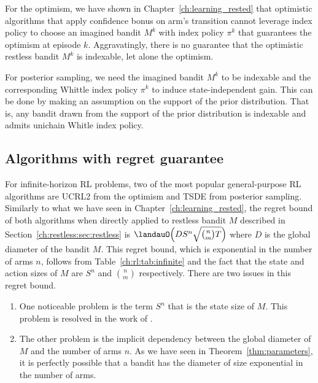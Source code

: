 For the optimism, we have shown in Chapter~\ref{ch:learning_rested} that optimistic algorithms that apply confidence bonus on arm's transition cannot leverage index policy to choose an imagined bandit $M^k$ with index policy $\pi^k$ that guarantees the optimism at episode $k$.
Aggravatingly, there is no guarantee that the optimistic restless bandit $M^k$ is indexable, let alone the optimism.

For posterior sampling, we need the imagined bandit $M^k$ to be indexable and the corresponding Whittle index policy $\pi^k$ to induce state-independent gain.
This can be done by making an assumption on the support of the prior distribution.
That is, any bandit drawn from the support of the prior distribution is indexable and admits unichain Whitle index policy.

\subsection{Algorithms with regret guarantee}

For infinite-horizon RL problems, two of the most popular general-purpose RL algorithms are UCRL2 \cite{jaksch2010near} from the optimism and TSDE \cite{ouyang2017learning} from posterior sampling.
Similarly to what we have seen in Chapter~\ref{ch:learning_rested}, the regret bound of both algorithms when directly applied to restless bandit $M$ described in Section~\ref{ch:restless:sec:restless} is $\landauO\Bigl(DS^n\sqrt{{n \choose m}T}\Bigr)$ where $D$ is the global diameter of the bandit $M$. This regret bound, which is exponential in the number of arms $n$, follows from Table~\ref{ch:rl:tab:infinite} and the fact that the state and action sizes of $M$ are $S^n$ and ${n \choose m}$ respectively.
There are two issues in this regret bound.
\begin{enumerate}[label=(\alph*)]
    \item \label{it:state_exponential} One noticeable problem is the term $S^n$ that is the state size of $M$. This problem is resolved in the work of \cite{ortner2012regret, jung2019thompson, akbarzadeh2022learning}.
    \item \label{it:diameter_exponential} The other problem is the implicit dependency between the global diameter of $M$ and the number of arms $n$. As we have seen in Theorem~\ref{thm:parameters}, it is perfectly possible that a bandit has the diameter of size exponential in the number of arms.
\end{enumerate}

